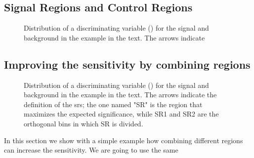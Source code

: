 \subsection{Signal Regions and Control Regions}
\label{sec:example_cr}

\begin{figure}[h]
\centering 
{}
\caption{
Distribution of a discriminating variable (\meff) for the signal and background in the example in the text. The arrows indicate 
}
\label{fig:stat:example}
\end{figure}

\subsection{Improving the sensitivity by combining regions}
\label{sec:example_combi}

\begin{figure}[h]
\centering 
\caption{
Distribution of a discriminating variable (\meff) for the signal and background in the example in the text.
 The arrows indicate the definition of the \glspl{sr}; the one named "SR" is the region that maximizes the expected significance, while SR1 and SR2 are the orthogonal bins in which SR is divided.
}
\label{fig:stat:example}
\end{figure}
In this section we show with a simple example how combining different regions can increase the sensitivity. We are going to use the same 




